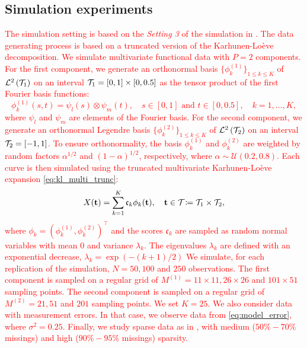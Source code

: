 \subsection{Simulation experiments} %
\label{sub:simulation_experiments}

\textcolor{red}{The simulation setting is based on the \emph{Setting 3} of the simulation in \cite{happMultivariateFunctionalPrincipal2018a}.
The data generating process is based on a truncated version of the Karhunen-Loève decomposition. We simulate multivariate functional data with $P = 2$ components. For the first component, we generate an orthonormal basis $\{\phi^{(1)}_k\}_{1 \leq k \leq K}$ of $\mathcal{L}^{2}\left(\mathcal{T}_{1}\right)$ on an interval $\mathcal{T}_{1} = [0, 1] \times [0, 0.5]$ as the tensor product of the first Fourier basis functions:
\begin{equation}
    \phi^{(1)}_k(s, t) = \psi_l(s) \otimes \psi_m(t), \quad s \in [0, 1] \text{ and } t \in [0, 0.5],\quad k = 1, \dots, K,
\end{equation}
where $\psi_l$ and $\psi_m$ are elements of the Fourier basis. For the second component, we generate an orthonormal Legendre basis $\{\phi^{(2)}_k\}_{1 \leq k \leq K}$ of $\mathcal{L}^{2}\left(\mathcal{T}_{2}\right)$ on an interval $\mathcal{T}_{2} = [-1, 1]$. To ensure orthonormality, the basis $\phi^{(1)}_k$ and $\phi^{(2)}_k$ are weighted by random factors $\alpha^{1/2}$ and $(1 - \alpha)^{1/2}$, respectively, where $\alpha \sim \mathcal{U}(0.2, 0.8)$.
Each curve is then simulated using the truncated multivariate Karhunen-Loève expansion \eqref{eq:kl_multi_trunc}:
\begin{equation}
    X(\mathbf{t}) = \sum_{k = 1}^K \mathfrak{c}_k \phi_k(\mathbf{t}), \quad \mathbf{t} \in \mathcal{T}_{} \coloneqq \mathcal{T}_{1} \times \mathcal{T}_{2},
\end{equation}
where $\phi_k = (\phi^{(1)}_k, \phi^{(2)}_k)^\top$ and the scores $\mathfrak{c}_k$ are sampled as random normal variables with mean $0$ and variance $\lambda_k$. The eigenvalues $\lambda_k$ are defined with an exponential decrease, $\lambda_k = \exp(-(k + 1)/2)$ We simulate, for each replication of the simulation, $N = 50, 100$ and $250$ observations. The first component is sampled on a regular grid of $M^{(1)} = 11 \times 11, 26 \times 26$ and $101 \times 51$ sampling points. The second component is sampled on a regular grid of $M^{(2)} = 21, 51$ and $201$ sampling points. We set $K = 25$.}
\textcolor{red}{We also consider data with measurement errors. In that case, we observe data from \eqref{eq:model_error}, where $\sigma^2 = 0.25$. Finally, we study sparse data as in \cite{happMultivariateFunctionalPrincipal2018a}, with medium ($50\%-70\%$ missings) and high ($90\%-95\%$ missings) sparsity.}

